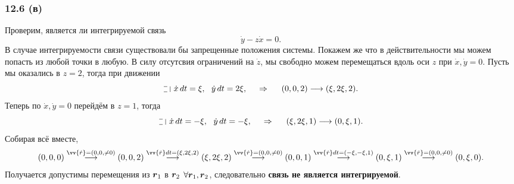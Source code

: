 \subsubsection*{12.6 (в)}

Проверим, является ли интегрируемой связь 
\begin{equation*}
    \dot{y} - z \dot{x} = 0.
\end{equation*}
В случае интегрируемости связи существовали бы запрещенные положения системы. Покажем же что в действительности мы можем попасть из любой точки в любую. В силу отсутсвия ограничений на $\dot{z}$, мы свободно можем перемещаться вдоль оси $z$ при $\dot{x}, \dot{y} = 0$. Пусть мы оказались в $z = 2$, тогда при движении
\begin{equation*}
    \letus \ \dot{x} \d t = \xi,
    \ \ \dot{y} \d t=  2 \xi, \hspace{0.5cm} \Rightarrow \hspace{0.5cm} 
    (0, 0, 2) \longrightarrow (\xi, 2 \xi, 2).
\end{equation*}
Теперь по $\dot{x}, \dot{y} = 0$ перейдём в $z = 1$, тогда
\begin{equation*}
    \letus \ \dot{x} \d t = -\xi, \ \ \dot{y} \d t = -\xi,
    \hspace{0.5cm} \Rightarrow \hspace{0.5cm} 
    (\xi, 2 \xi, 1) \longrightarrow (0, \xi, 1).
\end{equation*}
Собирая всё вместе,
\begin{equation*}
    (0, 0, 0)
    \overset{\vv{\dot{r}} = (0, 0, \neq 0)}{\longrightarrow} 
    (0, 0, 2)
    \overset{\vv{\dot{r}}dt = (\xi, 2\xi, 2)}{\longrightarrow} 
    (\xi, 2 \xi, 2)
    \overset{\vv{\dot{r}} = (0, 0, \neq 0)}{\longrightarrow} 
    (0, 0, 1)
    \overset{\vv{\dot{r}}dt = (-\xi, -\xi, 1)}{\longrightarrow} 
    (0, \xi, 1)
    \overset{\vv{\dot{r}} = (0, 0, \neq 0)}{\longrightarrow} 
    (0, \xi, 0).
\end{equation*}
Получается допустимы перемещения из $\mbox{\boldmath $r$}_1$ в $\mbox{\boldmath $r$}_2$ $\forall \mbox{\boldmath $r$}_1, \mbox{\boldmath $r$}_2$, следовательно \textbf{связь не является интегрируемой}.

